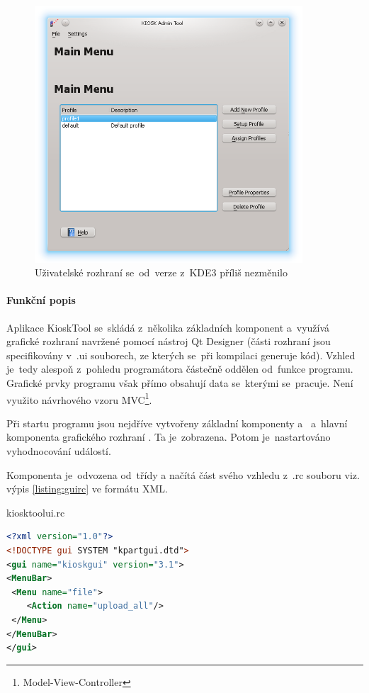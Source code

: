 \begin{figure}[h]
    \centering
    \includegraphics[width=10cm]{obrazky/KioskToolKDE4/kiosktool_kde4.png}
    \caption{Uživatelské rozhraní se~od~verze z~KDE3 příliš nezměnilo}
    \label{fig:kt4_uvod}
\end{figure}

\paragraph{Funkční popis}
Aplikace KioskTool se~skládá z~několika základních komponent a~využívá grafické rozhraní navržené pomocí nástroj Qt Designer (části rozhraní jsou specifikovány v~.ui souborech, ze kterých se~při kompilaci generuje kód). Vzhled je~tedy alespoň z~pohledu programátora částečně oddělen od~funkce programu. Grafické prvky programu však přímo obsahují data se~kterými se~pracuje. Není využito návrhového vzoru MVC\footnote{Model-View-Controller}.

Při startu programu jsou nejdříve vytvořeny základní komponenty  a~ a~hlavní komponenta grafického rozhraní . Ta je~zobrazena. Potom je~nastartováno vyhodnocování událostí.

Komponenta  je~odvozena od~třídy  a načítá část svého vzhledu z~.rc souboru viz. výpis  \ref{listing:guirc} ve formátu XML.
\begin{mylisting}
\caption{kiosktoolui.rc}
\label{listing:guirc}
\begin{lstlisting}[language=XML]
<?xml version="1.0"?>
<!DOCTYPE gui SYSTEM "kpartgui.dtd">
<gui name="kioskgui" version="3.1">
<MenuBar>
 <Menu name="file">
    <Action name="upload_all"/>
 </Menu>
</MenuBar>
</gui>
\end{lstlisting}
\end{mylisting}

